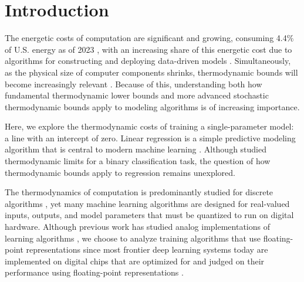 \documentclass[12pt,onecolumn, margin=1in]{IEEEtran}
\begin{document}
\section{Introduction}








The energetic costs of computation are significant and growing, consuming 4.4$\%$ of U.S. energy as of 2023 \cite{Shehabi2024}, with an increasing share of this energetic cost due to algorithms for constructing and deploying data-driven models \cite{Luccioni2024, deVries2023, Verdecchia2023}. 
Simultaneously, as the physical size of computer components shrinks, thermodynamic bounds will become increasingly relevant \cite{Schuster2016, Conte2017, Kish2004, Zhang2022, Landauer1961, Bennett1982, Lloyd2000, Frank2017}. 
Because of this, understanding both how fundamental thermodynamic lower bounds \cite{Landauer1961, Bennett1982, Bennett1982b, Landauer1972} and more advanced stochastic thermodynamic \cite{WolpertStochThermo2024, Wolpert2019, Yadav2025, Manzano2024, KolchinskyWolpert2021} bounds apply to modeling algorithms is of increasing importance. 

Here, we explore the thermodynamic costs of training a single-parameter model: a line with an intercept of zero. Linear regression is a simple predictive modeling algorithm that is central to modern machine learning \cite{McCullochPitts1943, Rosenblatt1958, Widrow1960, garethisl}. 
Although \cite{thermo_of_learning} studied thermodynamic limits for a binary classification task, the question of how thermodynamic bounds apply to regression remains unexplored. 


The thermodynamics of computation is predominantly studied for discrete algorithms \cite{demaine_energy-efficient_2016, Wolpert2019}, yet many machine learning algorithms are designed for real-valued inputs, outputs, and model parameters that must be quantized to run on digital hardware. Although previous work has studied analog implementations of learning algorithms \cite{thermo_dnn}, we choose to analyze training algorithms that use floating-point representations since most frontier deep learning systems today are implemented on digital chips that are optimized for and judged on their performance using floating-point representations \cite{nvidia_nvidia_2025, advanced_micro_devices_inc_amd_2025}. 
\end{document}
